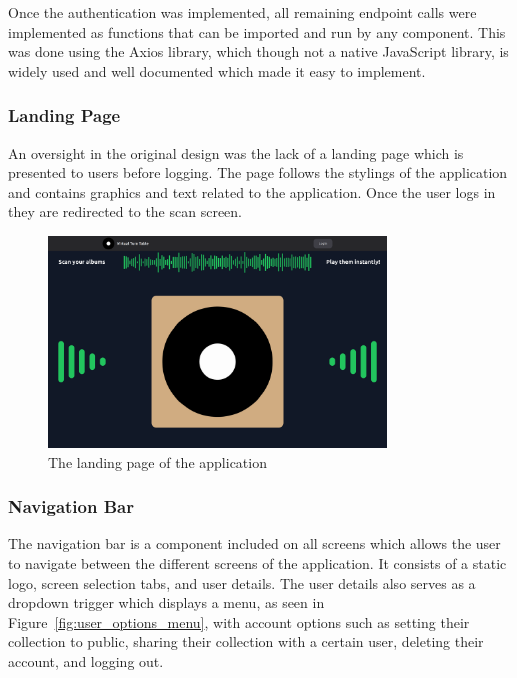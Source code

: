 Once the authentication was implemented, all remaining endpoint calls were implemented as functions that can be imported and run by any component. This was done using the Axios library, which though not a native JavaScript library, is widely used and well documented which made it easy to implement.

\subsubsection{Landing Page}
An oversight in the original design was the lack of a landing page which is presented to users before logging. The page follows the stylings of the application and contains graphics and text related to the application. Once the user logs in they are redirected to the scan screen.

\begin{figure} [H]
    \centering
    \includegraphics[width=0.8\textwidth]{figures/landing_page.png}
    \caption{The landing page of the application}
    \label{fig:landing_page}
\end{figure}


\subsubsection{Navigation Bar}
The navigation bar is a component included on all screens which allows the user to navigate between the different screens of the application. It consists of a static logo, screen selection tabs, and user details. The user details also serves as a dropdown trigger which displays a menu, as seen in Figure~\ref{fig:user_options_menu}, with account options such as setting their collection to public, sharing their collection with a certain user, deleting their account, and logging out.

